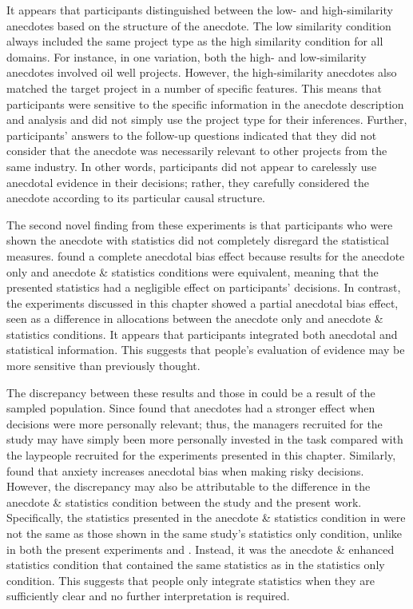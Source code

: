\documentclass[a4paper, nobind]{templates/ociamthesis}
\theoremstyle{definition}
\theoremstyle{definition}
\theoremstyle{definition}
\theoremstyle{definition}
\theoremstyle{remark}
\begin{document}
It appears that participants distinguished between the low- and high-similarity
anecdotes based on the structure of the anecdote. The low similarity condition
always included the same project type as the high similarity condition for all
domains. For instance, in one variation, both the high- and low-similarity
anecdotes involved oil well projects. However, the high-similarity anecdotes
also matched the target project in a number of specific features. This means
that participants were sensitive to the specific information in the anecdote
description and analysis and did not simply use the project type for their
inferences. Further, participants' answers to the follow-up questions indicated
that they did not consider that the anecdote was necessarily relevant to other
projects from the same industry. In other words, participants did not appear to
carelessly use anecdotal evidence in their decisions; rather, they carefully
considered the anecdote according to its particular causal structure.

The second novel finding from these experiments is that participants who were
shown the anecdote with statistics did not completely disregard the statistical
measures. \textcite{wainberg2013} found a complete anecdotal bias effect because results
for the anecdote only and anecdote \& statistics conditions were equivalent,
meaning that the presented statistics had a negligible effect on participants'
decisions. In contrast, the experiments discussed in this chapter showed a
partial anecdotal bias effect, seen as a difference in allocations between the
anecdote only and anecdote \& statistics conditions. It appears that participants
integrated both anecdotal and statistical information. This suggests that
people's evaluation of evidence may be more sensitive than previously thought.

The discrepancy between these results and those in \textcite{wainberg2013} could be a
result of the sampled population. Since \textcite{freling2020} found that anecdotes had a
stronger effect when decisions were more personally relevant; thus, the managers
recruited for the \textcite{wainberg2013} study may have simply been more personally
invested in the task compared with the laypeople recruited for the experiments
presented in this chapter. Similarly, \textcite{yang2015} found that anxiety increases
anecdotal bias when making risky decisions. However, the discrepancy may also be
attributable to the difference in the anecdote \& statistics condition between
the \textcite{wainberg2013} study and the present work. Specifically, the statistics
presented in the anecdote \& statistics condition in \textcite{wainberg2013} were not the
same as those shown in the same study's statistics only condition, unlike in
both the present experiments and \textcite{wainberg2018}. Instead, it was the anecdote \&
enhanced statistics condition that contained the same statistics as in the
statistics only condition. This suggests that people only integrate statistics
when they are sufficiently clear and no further interpretation is required.
\end{document}
